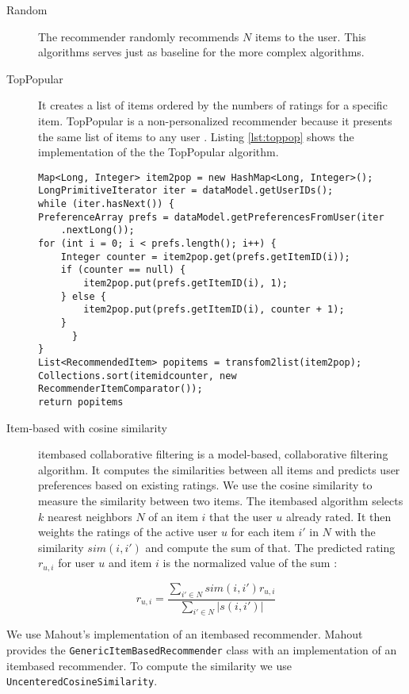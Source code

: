 \begin{description}
\item[Random] The recommender randomly recommends $N$ items to the user. This algorithms serves just as baseline for the more complex algorithms.
\item[TopPopular]  It creates a list of items ordered by the numbers of ratings for a specific item. TopPopular is a non-personalized recommender because it presents the same list of items to any user \cite{Cremonesi}. Listing \ref{lst:toppop} shows the implementation of the the TopPopular algorithm. 

\begin{lstlisting}[label=lst:toppop, caption={Implementation of top popular recommender}]
Map<Long, Integer> item2pop = new HashMap<Long, Integer>();
LongPrimitiveIterator iter = dataModel.getUserIDs();
while (iter.hasNext()) {
PreferenceArray prefs = dataModel.getPreferencesFromUser(iter
	.nextLong());
for (int i = 0; i < prefs.length(); i++) {
	Integer counter = item2pop.get(prefs.getItemID(i));
	if (counter == null) {
		item2pop.put(prefs.getItemID(i), 1);
	} else {
		item2pop.put(prefs.getItemID(i), counter + 1);
	}
      }
}
List<RecommendedItem> popitems = transfom2list(item2pop);
Collections.sort(itemidcounter, new RecommenderItemComparator()); 
return popitems
\end{lstlisting}

\item[Item-based with cosine similarity]  \Gls{itembased} collaborative filtering is a model-based, collaborative filtering algorithm. It computes the similarities between all items and predicts user preferences based on existing ratings. We use the cosine similarity \cite{ekstrand11} to measure the similarity between two items. The \gls{itembased} algorithm selects $k$ nearest neighbors $N$ of an item $i$ that the user $u$ already rated. It then weights the ratings of the active user $u$ for each item $i'$ in $N$ with the similarity $sim(i,i')$ and compute the sum of that. The predicted rating $r_{u,i}$ for user $u$ and item $i$ is the normalized value of the sum \cite{jannach11}:

\end{description}
\begin{equation}
  \label{eq:computeprediction}
  r_{u,i} = \frac{\sum_{i' \in N}{sim(i,i') r_{u,i}}}{\sum_{i' \in N}{|s(i,i')|}}
\end{equation}

We use Mahout's implementation of an \gls{itembased} recommender. Mahout provides the \verb|GenericItemBasedRecommender| class with an implementation of an \gls{itembased} recommender. To compute the similarity we use \verb|UncenteredCosineSimilarity|.

